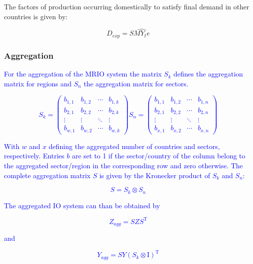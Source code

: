 \documentclass{jors}
\begin{document}
{The factors of production occurring domestically to satisfy final demand in
other countries is given by:

\begin{equation}
    D_{exp} = S\widehat{MY_{t}e}
\end{equation}


\subsubsection*{Aggregation}
\textcolor{blue}{
For the aggregation of the MRIO system the matrix $S_k$ defines
the aggregation matrix for regions and $S_n$ the aggregation matrix
for sectors.

\begin{equation}
    S_k =
    \begin{pmatrix}
      b_{1,1} & b_{1,2} & \cdots & b_{1,k} \\
      b_{2,1} & b_{2,2} & \cdots & b_{2,k} \\
      \vdots  & \vdots  & \ddots & \vdots  \\
      b_{w,1} & b_{w,2} & \cdots & b_{w,k}
    \end{pmatrix}
    S_n =
    \begin{pmatrix}
      b_{1,1} & b_{1,2} & \cdots & b_{1,n} \\
      b_{2,1} & b_{2,2} & \cdots & b_{2,n} \\
      \vdots  & \vdots  & \ddots & \vdots  \\
      b_{x,1} & b_{x,2} & \cdots & b_{x,n}
    \end{pmatrix}
\end{equation}

With $w$ and $x$ defining the aggregated number of countries and sectors,
respectively. Entries $b$ are set to 1 if the sector/country of the column
belong to the aggregated sector/region in the corresponding row and zero
otherwise. The complete aggregation matrix $S$ is given by the Kronecker
product of $S_k$ and $S_n$:

\begin{equation}
    S = S_k \otimes S_n
\end{equation}

The aggregated IO system can than be obtained by

\begin{equation}
    Z_{agg} = SZS^\mathrm{T} 
\end{equation}

and

\begin{equation}
    Y_{agg} = SY(S_k \otimes \mathrm{I})^\mathrm{T}
\end{equation}

}}
\end{document}
